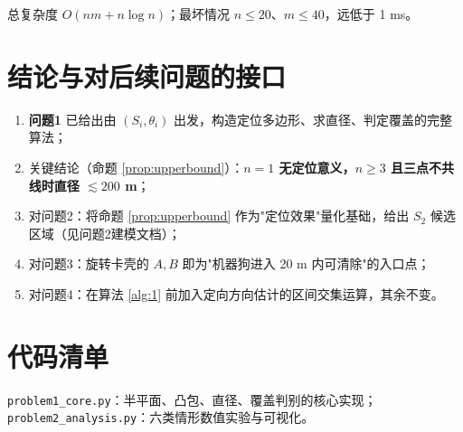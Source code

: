 \documentclass[a4paper,11pt]{article}
\begin{document}
\noindent 总复杂度 $O(nm+n\log n)$；最坏情况 $n\le 20$、$m\le 40$，远低于 1 ms。

\section{结论与对后续问题的接口}

\begin{enumerate}[leftmargin=2em]
\item \textbf{问题1} 已给出由 $(S_i,\theta_i)$ 出发，构造定位多边形、求直径、判定覆盖的完整算法；
\item 关键结论（命题 \ref{prop:upperbound}）：\textbf{$n=1$ 无定位意义，$n\ge 3$ 且三点不共线时直径 $\lesssim 200$ m}；
\item 对问题2：将命题 \ref{prop:upperbound} 作为"定位效果"量化基础，给出 $S_2$ 候选区域（见问题2建模文档）；
\item 对问题3：旋转卡壳的 $A,B$ 即为"机器狗进入 20 m 内可清除"的入口点；
\item 对问题4：在算法 \ref{alg:1} 前加入定向方向估计的区间交集运算，其余不变。
\end{enumerate}

\appendix
\section{代码清单}
\noindent\texttt{problem1\_core.py}：半平面、凸包、直径、覆盖判别的核心实现；
\noindent\texttt{problem2\_analysis.py}：六类情形数值实验与可视化。
\end{document}

